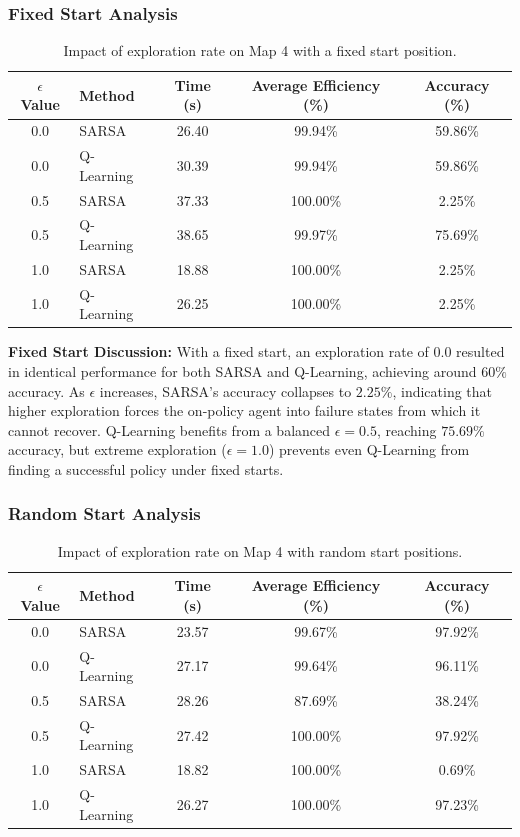 \documentclass{article}
\begin{document}
\subsubsection{Fixed Start Analysis}
\begin{table}[H]
\centering
\begin{tabular}{clccc}
\toprule
\textbf{$\epsilon$ Value} & \textbf{Method} & \textbf{Time (s)} & \textbf{Average Efficiency (\%)} & \textbf{Accuracy (\%)} \\ \midrule
0.0 & SARSA       & 26.40 & 99.94\% & 59.86\% \\
0.0 & Q-Learning  & 30.39 & 99.94\% & 59.86\% \\
0.5 & SARSA       & 37.33 & 100.00\% & 2.25\% \\
0.5 & Q-Learning  & 38.65 & 99.97\% & 75.69\% \\
1.0 & SARSA       & 18.88 & 100.00\% & 2.25\% \\
1.0 & Q-Learning  & 26.25 & 100.00\% & 2.25\% \\ \bottomrule
\end{tabular}
\caption{Impact of exploration rate on Map 4 with a fixed start position.}
\end{table}

\textbf{Fixed Start Discussion:} With a fixed start, an exploration rate of $0.0$ resulted in identical performance for both SARSA and Q-Learning, achieving around $60\%$ accuracy. As $\epsilon$ increases, SARSA's accuracy collapses to $2.25\%$, indicating that higher exploration forces the on-policy agent into failure states from which it cannot recover. Q-Learning benefits from a balanced $\epsilon=0.5$, reaching $75.69\%$ accuracy, but extreme exploration ($\epsilon=1.0$) prevents even Q-Learning from finding a successful policy under fixed starts.

\subsubsection{Random Start Analysis}
\begin{table}[H]
\centering
\begin{tabular}{clccc}
\toprule
\textbf{$\epsilon$ Value} & \textbf{Method} & \textbf{Time (s)} & \textbf{Average Efficiency (\%)} & \textbf{Accuracy (\%)} \\ \midrule
0.0 & SARSA       & 23.57 & 99.67\% & 97.92\% \\
0.0 & Q-Learning  & 27.17 & 99.64\% & 96.11\% \\
0.5 & SARSA       & 28.26 & 87.69\% & 38.24\% \\
0.5 & Q-Learning  & 27.42 & 100.00\% & 97.92\% \\
1.0 & SARSA       & 18.82 & 100.00\% & 0.69\% \\
1.0 & Q-Learning  & 26.27 & 100.00\% & 97.23\% \\ \bottomrule
\end{tabular}
\caption{Impact of exploration rate on Map 4 with random start positions.}
\end{table}
\end{document}
